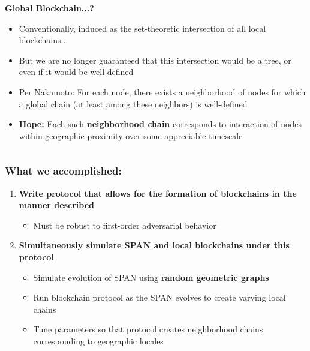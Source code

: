 \documentclass{beamer}
\begin{document}
\begin{frame}
\begin{columns}
		\begin{column}{0.4\textwidth}
			\centering
			\textbf{Global Blockchain...?}
			\begin{scriptsize}
				\begin{itemize}
					\item Conventionally, induced as the set-theoretic
						intersection of all local blockchains...
					\item But we are no longer guaranteed that this
						intersection would be a tree, or even if it would
						be well-defined
					\item Per Nakamoto: For each node,
						there exists a neighborhood of nodes for which
						a global chain (at least among these neighbors) is
						well-defined
					\item \textbf{Hope:} Each such \textbf{neighborhood chain}
						corresponds to interaction of nodes within
						geographic proximity over some appreciable timescale
				\end{itemize}
			\end{scriptsize}
		\end{column}
	\end{columns}
\end{frame}

\begin{frame}
	\frametitle{What we accomplished:}

	\begin{enumerate}
		\item \textbf{Write protocol that allows for the formation of
			blockchains in the manner described}
			\begin{itemize}
				\item Must be robust to first-order
					adversarial behavior
			\end{itemize}
		\item \textbf{Simultaneously simulate SPAN and local blockchains
			under this protocol}
			\begin{itemize}
				\item Simulate evolution of SPAN using \textbf{random
					geometric graphs}
				\item Run blockchain protocol as the SPAN evolves to
					create varying local chains
				\item Tune parameters so that protocol creates
				neighborhood chains corresponding to geographic
				locales
			\end{itemize}
	\end{enumerate}
\end{frame}
\end{document}

